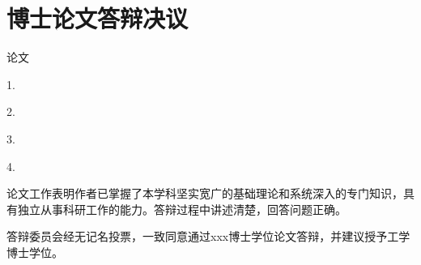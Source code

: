 \chapter{博士论文答辩决议}

\hspace{2em}论文

\hspace{2em}1. 

\hspace{2em}2. 

\hspace{2em}3. 

\hspace{2em}4. 

\hspace{2em}

\hspace{2em}论文工作表明作者已掌握了本学科坚实宽广的基础理论和系统深入的专门知识，具有独立从事科研工作的能力。答辩过程中讲述清楚，回答问题正确。

\hspace{2em}答辩委员会经无记名投票，一致同意通过xxx博士学位论文答辩，并建议授予工学博士学位。












